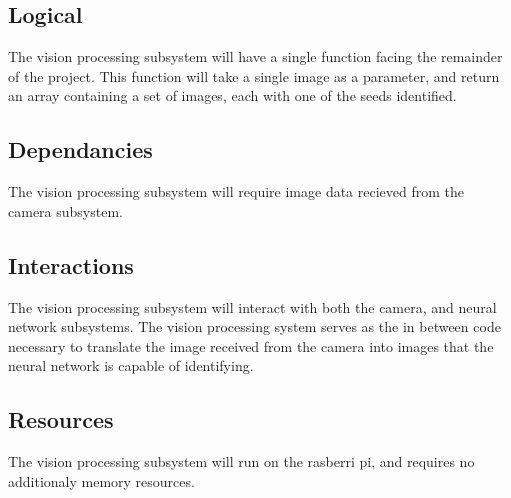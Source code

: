 \subsection{Logical}

The vision processing subsystem will have a single function facing the remainder of the project. 
This function will take a single image as a parameter, and return an array containing
a set of images, each with one of the seeds identified. 

\subsection{Dependancies} 

The vision processing subsystem will require image data recieved from the camera subsystem.

\subsection{Interactions}

The vision processing subsystem will interact with both the camera, and neural network subsystems. 
The vision processing system serves as the in between code necessary to translate the image received from the camera
into images that the neural network is capable of identifying.

\subsection{Resources} 

The vision processing subsystem will run on the rasberri pi, 
and requires no additionaly memory resources.



